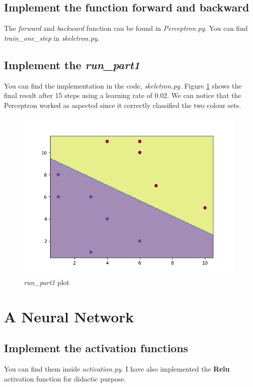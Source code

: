 \documentclass[11pt]{article}
\begin{document}
\subsection{Implement the function forward and backward}
The \emph{forward} and \emph{backward} function can be found in \emph{Perceptron.py}. You can find \emph{train\_one\_step} in \emph{skeletron.py}.

\subsection{Implement the \emph{run\_part1}}
You can find the implementation in the code, \emph{skeletron.py}. Figure \ref{fig:runPart1} shows the final result after 15 steps using a learning rate of $0.02$. We can notice that the Perceptron worked as aspected since it correctly classified the two colour sets.
\begin{figure}[H]
	\centering
	\includegraphics[scale=0.5]{images/run_part1}
	\caption{\emph{run\_part1} plot}
	\label{fig:runPart1}
\end{figure}

\section{A Neural Network}
\subsection{ Implement the activation functions}
You can find them inside \emph{activation.py}. I have also implemented the \textbf{Relu} activation function for didactic purpose.
\end{document}
